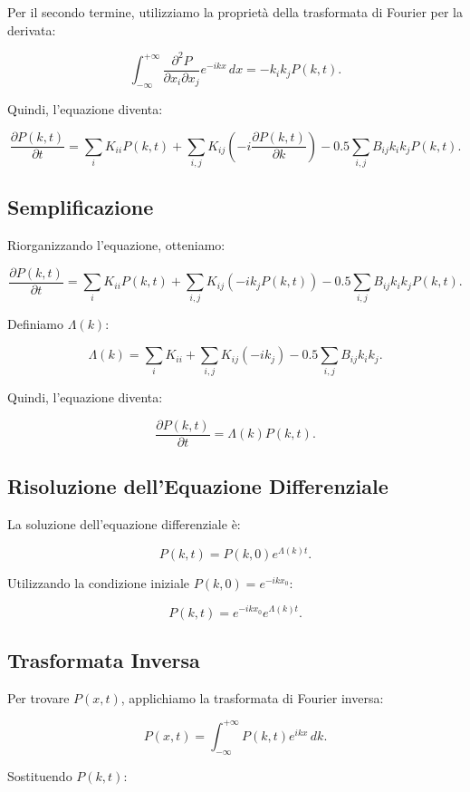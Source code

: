 \documentclass{article}
\begin{document}
Per il secondo termine, utilizziamo la proprietà della trasformata di Fourier per la derivata:

\[
\int_{-\infty}^{+\infty} \frac{\partial^2 P}{\partial x_i \partial x_j} e^{-ikx} \, dx = -k_i k_j P(k, t).
\]

Quindi, l'equazione diventa:

\[
\frac{\partial P(k, t)}{\partial t} = \sum_i K_{ii} P(k, t) + \sum_{i,j} K_{ij} \left( -i \frac{\partial P(k, t)}{\partial k} \right) - 0.5 \sum_{i,j} B_{ij} k_i k_j P(k, t).
\]

\subsection*{Semplificazione}

Riorganizzando l'equazione, otteniamo:

\[
\frac{\partial P(k, t)}{\partial t} = \sum_i K_{ii} P(k, t) + \sum_{i,j} K_{ij} \left( -ik_j P(k, t) \right) - 0.5 \sum_{i,j} B_{ij} k_i k_j P(k, t).
\]

Definiamo \(\Lambda(k)\):

\[
\Lambda(k) = \sum_i K_{ii} + \sum_{i,j} K_{ij} (-ik_j) - 0.5 \sum_{i,j} B_{ij} k_i k_j.
\]

Quindi, l'equazione diventa:

\[
\frac{\partial P(k, t)}{\partial t} = \Lambda(k) P(k, t).
\]

\subsection*{Risoluzione dell'Equazione Differenziale}

La soluzione dell'equazione differenziale è:

\[
P(k, t) = P(k, 0) e^{\Lambda(k) t}.
\]

Utilizzando la condizione iniziale \( P(k, 0) = e^{-ikx_0} \):

\[
P(k, t) = e^{-ikx_0} e^{\Lambda(k) t}.
\]

\subsection*{Trasformata Inversa}

Per trovare \( P(x, t) \), applichiamo la trasformata di Fourier inversa:

\[
P(x, t) = \int_{-\infty}^{+\infty} P(k, t) e^{ikx} \, dk.
\]

Sostituendo \( P(k, t) \):
\end{document}
